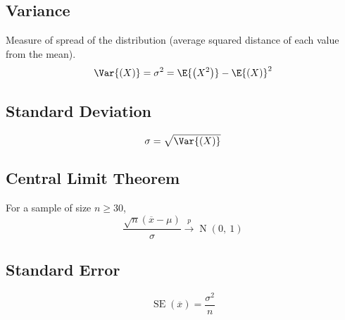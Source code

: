 \documentclass{article}
\begin{document}
\begin{multicols}{3}
        \subsection{Variance}
        Measure of spread of the distribution (average squared distance of each value from the mean).
        \begin{equation*}
            \Var{\left( X \right)} = \sigma^2 = \E{\left( X^2 \right)} - \E{\left( X \right)}^2
        \end{equation*}
        \subsection{Standard Deviation}
        \begin{equation*}
            \sigma = \sqrt{\Var{\left( X \right)}}
        \end{equation*}
        

\subsection{Central Limit Theorem}
For a sample of size \(n \ge 30\),
\begin{equation*}
    \frac{\sqrt{n}\left( \overline{x} - \mu \right)}{\sigma} \overset{p}{\rightarrow} \operatorname{N}{\left( 0,\: 1 \right)}
\end{equation*}
\subsection{Standard Error}
\begin{equation*}
    \operatorname{SE}{\left( \overline{x} \right)} = \frac{\sigma^2}{n}
\end{equation*}

\end{multicols}
\end{document}
